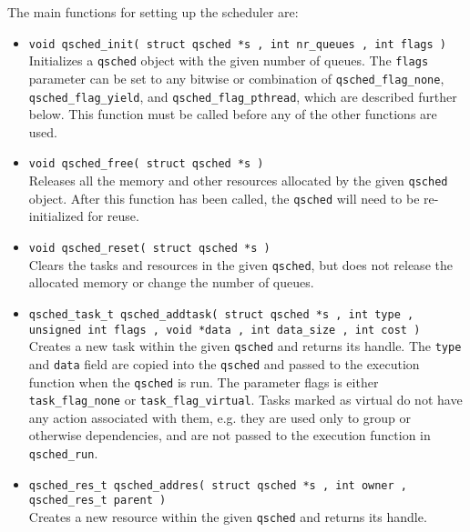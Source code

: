 \documentclass[preprint]{elsarticle}
\begin{document}
The main functions for setting up the scheduler are:
\begin{itemize}
    \item {\tt void qsched\_init( struct qsched *s , int nr\_queues , int flags )} \\
        Initializes a {\tt qsched} object with the given number of queues.
        The {\tt flags} parameter can be set to any bitwise or combination
        of {\tt qsched\_flag\_none},
        {\tt qsched\_flag\_yield}, and {\tt qsched\_flag\_pthread},
        which are described further below.
        This function must be called before any of the other
        functions are used.
        \vspace{1mm}
    \item {\tt void qsched\_free( struct qsched *s )} \\
        Releases all the memory and other resources allocated by the
        given {\tt qsched} object.
        After this function has been called, the {\tt qsched} will
        need to be re-initialized for reuse.
        \vspace{1mm}
    \item {\tt void qsched\_reset( struct qsched *s )} \\
        Clears the tasks and resources in the given {\tt qsched},
        but does not release the allocated memory or change
        the number of queues.
        \vspace{1mm}
    \item {\tt qsched\_task\_t qsched\_addtask( struct qsched *s , int type , unsigned int flags , void *data , int data\_size , int cost )} \\
        Creates a new task within the given {\tt qsched} and returns
        its handle.
        The {\tt type} and {\tt data} field are copied into the {\tt qsched}
        and passed to the execution function when the {\tt qsched} is run.
        The parameter flags is either {\tt task\_flag\_none} or
        {\tt task\_flag\_virtual}.
        Tasks marked as virtual do not have any action associated with them,
        e.g. they are used only to group or otherwise dependencies, and
        are not passed to the execution function in {\tt qsched\_run}.
        \vspace{1mm}
    \item {\tt qsched\_res\_t qsched\_addres( struct qsched *s , int owner , qsched\_res\_t parent )} \\
        Creates a new resource within the given {\tt qsched} and returns
        its handle.

\end{itemize}
\end{document}

